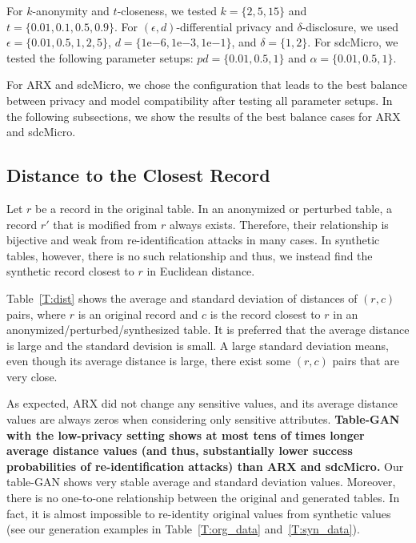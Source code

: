For $k$-anonymity and $t$-closeness, we tested $k=\{2,5,15\}$ and $t=\{0.01,0.1,0.5, 0.9\}$. For $(\epsilon,d)$-differential privacy and $\delta$-disclosure, we used $\epsilon=\{0.01, 0.5, 1, 2, 5\}$, $d = \{1\mathrm{e}{-6}, 1\mathrm{e}{-3}, 1\mathrm{e}{-1} \}$, and $\delta=\{1, 2\}$. For sdcMicro, we tested the following parameter setups: $pd = \{0.01, 0.5, 1\}$ and $\alpha = \{0.01, 0.5, 1\}$.

For ARX and sdcMicro, we chose the configuration that leads to the best balance between privacy and model compatibility after testing all parameter setups. In the following subsections, we show the results of the best balance cases for ARX and sdcMicro.

\subsection{Distance to the Closest Record}
Let $r$ be a record in the original table. In an anonymized or perturbed table, a record $r'$ that is modified from $r$ always exists. Therefore, their relationship is bijective and weak from re-identification attacks in many cases. In synthetic tables, however, there is no such relationship and thus, we instead find the synthetic record closest to $r$ in Euclidean distance.

Table~\ref{T:dist} shows the average and standard deviation of distances of $(r,c)$ pairs, where $r$ is an original record and $c$ is the record closest to $r$ in an anonymized\slash perturbed\slash synthesized table. It is preferred that the average distance is large and the standard devision is small. A large standard deviation means, even though its average distance is large, there exist some $(r,c)$ pairs that are very close.

As expected, ARX did not change any sensitive values, and its average distance values are always zeros when considering only sensitive attributes. \textbf{Table-GAN with the low-privacy setting shows at most tens of times longer average distance values (and thus, substantially lower success probabilities of re-identification attacks) than ARX and sdcMicro.} Our table-GAN shows very stable average and standard deviation values. Moreover, there is no one-to-one relationship between the original and generated tables. In fact, it is almost impossible to re-identity original values from synthetic values (see our generation examples in Table~\ref{T:org_data} and~\ref{T:syn_data}).

